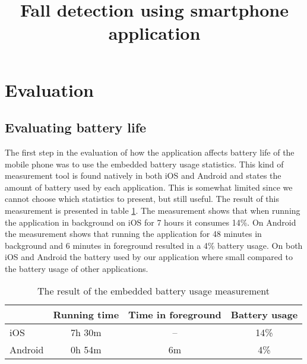 \documentclass[12pt, a4paper, onecolumn]{article}
\begin{document}
	
	\title{Fall detection using smartphone application}
	\maketitle
	
	\tableofcontents
	\newpage
	
	\section{Evaluation}
	
	
	\subsection{Evaluating battery life}
	
	The first step in the evaluation of how the application affects battery life of the mobile phone was to use the embedded battery usage statistics. This kind of measurement tool is found natively in both iOS and Android and states the amount of battery used by each application. This is somewhat limited since we cannot choose which statistics to present, but still useful. The result of this measurement is presented in table \ref{table:battery-embedded}. The measurement shows that when running the application in background on iOS for 7 hours it consumes 14\%. On Android the measurement shows that running the application for 48 minutes in background and 6 minutes in foreground resulted in a 4\% battery usage. On both iOS and Android the battery used by our application where small compared to the battery usage of other applications.
	
	\begin{table}[H]
		\centering
		\begin{tabular}{|l|c|c|c|}
			\hline
			& Running time & Time in foreground & Battery usage \\ \hline
			iOS     & 7h 30m & -- & 14\%        \\ \hline
			Android & 0h 54m & 6m & 4\%        \\ \hline
		\end{tabular}
		\caption{The result of the embedded battery usage measurement}
		\label{table:battery-embedded}
	\end{table}
	\newpage
	
	
	
	
\end{document}
